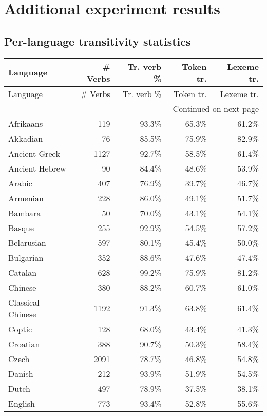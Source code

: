 \chapter{Additional experiment results}
\section{Per-language transitivity statistics}\label{appendix:exp1}
\begin{longtable}{lrrrr}
    \toprule
    Language & \# Verbs & Tr. verb \% & Token tr. & Lexeme tr. \\
    \midrule
    \endfirsthead
    \toprule
    Language & \# Verbs & Tr. verb \% & Token tr. & Lexeme tr. \\
    \midrule
    \endhead
    \midrule
    \multicolumn{5}{r}{Continued on next page} \\
    \midrule
    \endfoot
    \bottomrule
    \endlastfoot
    Afrikaans & 119 & 93.3\% & 65.3\% & 61.2\% \\
    Akkadian & 76 & 85.5\% & 75.9\% & 82.9\% \\
    Ancient Greek & 1127 & 92.7\% & 58.5\% & 61.4\% \\
    Ancient Hebrew & 90 & 84.4\% & 48.6\% & 53.9\% \\
    Arabic & 407 & 76.9\% & 39.7\% & 46.7\% \\
    Armenian & 228 & 86.0\% & 49.1\% & 51.7\% \\
    Bambara & 50 & 70.0\% & 43.1\% & 54.1\% \\
    Basque & 255 & 92.9\% & 54.5\% & 57.2\% \\
    Belarusian & 597 & 80.1\% & 45.4\% & 50.0\% \\
    Bulgarian & 352 & 88.6\% & 47.6\% & 47.4\% \\
    Catalan & 628 & 99.2\% & 75.9\% & 81.2\% \\
    Chinese & 380 & 88.2\% & 60.7\% & 61.0\% \\
    Classical Chinese & 1192 & 91.3\% & 63.8\% & 61.4\% \\
    Coptic & 128 & 68.0\% & 43.4\% & 41.3\% \\
    Croatian & 388 & 90.7\% & 50.3\% & 58.4\% \\
    Czech & 2091 & 78.7\% & 46.8\% & 54.8\% \\
    Danish & 212 & 93.9\% & 51.9\% & 54.5\% \\
    Dutch & 497 & 78.9\% & 37.5\% & 38.1\% \\
    English & 773 & 93.4\% & 52.8\% & 55.6\% \\

\end{longtable}
